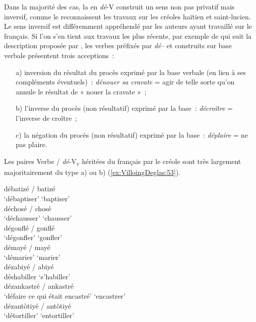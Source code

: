 \documentclass[output=paper]{langsci/langscibook}
\begin{document}
\label{préfixation-dé-v-uxe0-sens-inversif}

Dans la majorité des cas, la  en \emph{dé}-V construit un
sens non pas privatif mais inversif, comme le reconnaissent les travaux
sur les créoles haïtien et saint-lucien. Le sens inversif est
différemment appréhendé par les auteurs ayant travaillé sur le français.
Si l'on s'en tient aux travaux les plus récents, par exemple de %
\citet[1778]{Jalenques2014} %
%
qui suit la description proposée par %
\citet{Gerhard-Krait00}%
%
, les verbes préfixés par \emph{dé}-- et construits
sur base verbale présentent trois acceptions~:

\begin{enumerate}
\item[a)] inversion du résultat du procès exprimé par la base verbale (en lien
à ses compléments éventuels)~: \emph{dénouer sa cravate }= agir de telle
sorte qu'on annule le résultat de « nouer la cravate »~;

\item[b)] l'inverse du procès (non résultatif) exprimé par la base~:
\emph{décroître }= l'inverse de croître~;

\item[c)] la négation du procès (non résultatif) exprimé par la base~:
\emph{déplaire }= ne pas plaire.
\end{enumerate}

Les paires Verbe / \emph{dé}-V\textsubscript{\textsc{v}} héritées du français par le
créole sont très largement majoritairement du type a) ou b) (\ref{ex:VilloingDeglas:53}).


  \ea \label{ex:VilloingDeglas:53}
        \ea \gll débatizé / batizé\\
          {`débaptiser'} {} {`baptiser'}\\
        \ex \gll  déchosé / chosé\\
          {`déchausser'} {} {`chausser'}\\
        \ex \gll  dégonflé / gonflé\\
          {`dégonfler'} {} {`gonfler'}\\
        \ex \gll  démayé / mayé\\
          {`démarier'} {} {`marier'}\\
        \ex \gll  dézabiyé  / abiyé\\
          déshabiller {} {`s'habiller'}\\
        \ex \gll  dézankastré / ankastré\\
          {`défaire ce qui était encastré'} {} {`encastrer'}\\
        \ex \gll  dézantòtiyé / antòtiyé\\
          {`détortiller'} {} {`entortiller'}\\
  \z\z
\end{document}
